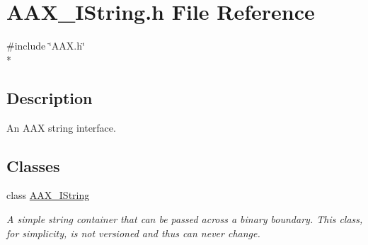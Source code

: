 \hypertarget{a00261}{}\section{A\+A\+X\+\_\+\+I\+String.\+h File Reference}
\label{a00261}
{\ttfamily \#include \char`\"{}A\+A\+X.\+h\char`\"{}}\\*


\subsection{Description}
An A\+A\+X string interface. 

\subsection*{Classes}
\begin{DoxyCompactItemize}
\item 
class \hyperlink{a00113}{A\+A\+X\+\_\+\+I\+String}
\begin{DoxyCompactList}\small\item\em A simple string container that can be passed across a binary boundary. This class, for simplicity, is not versioned and thus can never change. \end{DoxyCompactList}\end{DoxyCompactItemize}
